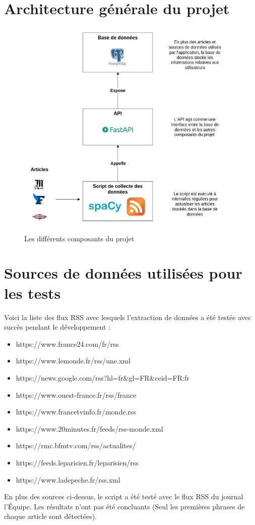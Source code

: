 \documentclass[french]{article}
\begin{document}
    \section*{Architecture générale du projet}
    \begin{figure}[h]
        \includegraphics[width=12cm]{composants}
        \centering
        \caption{Les différents composants du projet}
        \centering
    \end{figure}
    \section*{Sources de données utilisées pour les tests}
    Voici la liste des flux RSS avec lesquels l'extraction de données a été testée avec succès pendant le développement :
    \begin{itemize}
        \item https://www.france24.com/fr/rss
        \item https://www.lemonde.fr/rss/une.xml
        \item https://news.google.com/rss?hl=fr\&gl=FR\&ceid=FR:fr
        \item https://www.ouest-france.fr/rss/france
        \item https://www.francetvinfo.fr/monde.rss
        \item https://www.20minutes.fr/feeds/rss-monde.xml
        \item https://rmc.bfmtv.com/rss/actualites/
        \item https://feeds.leparisien.fr/leparisien/rss
        \item https://www.ladepeche.fr/rss.xml
    \end{itemize}
    En plus des sources ci-dessus, le script a été testé avec le flux RSS du journal l'Équipe. Les résultats n'ont pas été concluants (Seul les premières phrases de chaque article sont détectées).
    
\end{document}
